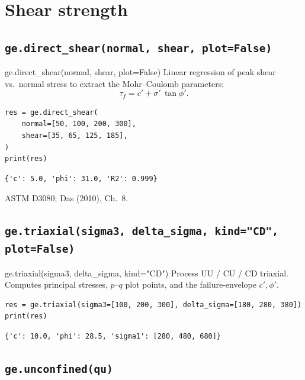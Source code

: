 \documentclass[11pt,a4paper,openany]{book}
\newcommand{\sigmaeff}{\sigma'}
\begin{document}
\section{Shear strength}

\subsection{\texttt{ge.direct\_shear(normal, shear, plot=False)}}

\begin{funcbox}{ge.direct\_shear(normal, shear, plot=False)}
Linear regression of peak shear vs.\ normal stress to extract the
Mohr--Coulomb parameters:
\[
\tau_f = c' + \sigmaeff\,\tan\phi'.
\]
\end{funcbox}

\begin{lstlisting}
res = ge.direct_shear(
    normal=[50, 100, 200, 300],
    shear=[35, 65, 125, 185],
)
print(res)
\end{lstlisting}
\begin{lstlisting}[style=output]
{'c': 5.0, 'phi': 31.0, 'R2': 0.999}
\end{lstlisting}

\begin{refbox}
ASTM D3080; Das (2010), Ch.~8.
\end{refbox}

\subsection{\texttt{ge.triaxial(sigma3, delta\_sigma, kind="CD", plot=False)}}

\begin{funcbox}{ge.triaxial(sigma3, delta\_sigma, kind="CD")}
Process UU / CU / CD triaxial. Computes principal stresses, $p$--$q$
plot points, and the failure-envelope $c', \phi'$.
\end{funcbox}

\begin{lstlisting}
res = ge.triaxial(sigma3=[100, 200, 300], delta_sigma=[180, 280, 380])
print(res)
\end{lstlisting}
\begin{lstlisting}[style=output]
{'c': 10.0, 'phi': 28.5, 'sigma1': [280, 480, 680]}
\end{lstlisting}

\subsection{\texttt{ge.unconfined(qu)}}
\end{document}
